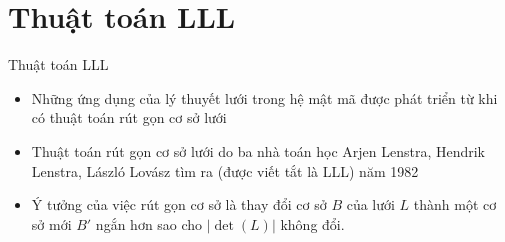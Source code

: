 \documentclass{beamer}
\begin{document}

\section{Thuật toán LLL}
\begin{frame}{Thuật toán LLL}
\begin{itemize}
\item Những ứng dụng của lý thuyết lưới trong hệ mật mã được phát triển từ khi có thuật toán rút gọn cơ sở lưới
\item Thuật toán rút gọn cơ sở lưới do ba nhà toán học Arjen Lenstra, Hendrik Lenstra, László Lovász tìm ra (được viết tắt là LLL) năm 1982
\item Ý tưởng của việc rút gọn cơ sở là thay đổi cơ sở $B$ của lưới $L$ thành một cơ sở mới $B'$ ngắn hơn sao cho
$|\det(L)|$ không đổi.
\end{itemize}
\end{frame}


\end{document}
